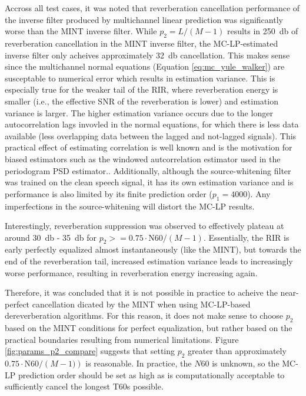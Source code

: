 Accross all test cases, it was noted that reverberation cancellation performance of the inverse filter produced by multichannel linear prediction was significantly worse than the MINT inverse filter. While $p_2=L/\left(M-1\right)$ results in \qty{250}{\decibel} of reverberation cancellation in the MINT inverse filter, the MC-LP-estimated inverse filter only acheives approximately \qty{32}{\decibel} cancellation. This makes sense since the multichannel normal equations (Equation \ref{eq:mc_yule_walker}) are susceptable to numerical error which results in estimation variance. This is especially true for the weaker tail of the RIR, where reverberation energy is smaller (i.e., the effective SNR of the reverberation is lower) and estimation variance is larger. The higher estimation variance occurs due to the longer autocorrelation lags invovled in the normal equations, for which there is less data available (less overlapping data between the lagged and not-lagged signals). This practical effect of estimating correlation is well known and is the motivation for biased estimators such as the windowed autcorrelation estimator used in the periodogram PSD estimator.\citep{oppenheim1999discrete}. Additionally, although the source-whitening filter was trained on the clean speech signal, it has its own estimation variance and is performance is also limited by its finite prediction order ($p_1 = 4000$). Any imperfections in the source-whitening will distort the MC-LP results.

Interestingly, reverberation suppression was observed to effectively plateau at around \qty{30}{\decibel} - \qty{35}{\decibel} for $p_2 >= 0.75 \cdot \mathrm{N60} / \left(M-1\right)$. Essentially, the RIR is early perfectly equalized almost instantaneously (like the MINT), but towards the end of the reverberation tail, increased estimation variance leads to increasingly worse performance, resulting in reverberation energy increasing again. 

Therefore, it was concluded that it is not possible in practice to acheive the near-perfect cancellation dicated by the MINT when using MC-LP-based dereverberation algorithms. For this reason, it does not make sense to choose $p_2$ based on the MINT conditions for perfect equalization, but rather based on the practical boundaries resulting from numerical limitations. Figure \ref{fig:params_p2_compare} suggests that setting $p_2$ greater than approximately $0.75 \cdot \mathrm{N60} / \left(M-1)\right)$ is reasonable. In practice, the $N60$ is unknown, so the MC-LP prediction order should be set as high as is computationally acceptable to sufficiently cancel the longest T60s possible.

